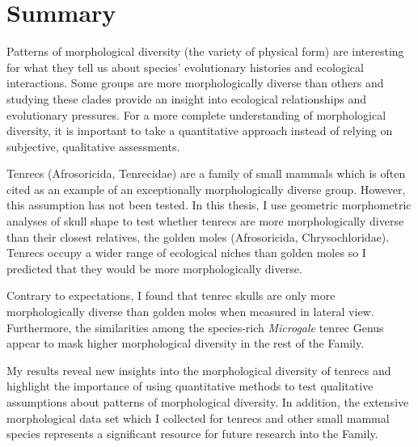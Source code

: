 \chapter*{Summary}

	Patterns of morphological diversity (the variety of physical form) are interesting for what they tell us about species' evolutionary histories and ecological interactions. Some groups are more morphologically diverse than others and studying these clades provide an insight into ecological relationships and evolutionary pressures. For a more complete understanding of morphological diversity, it is important to take a quantitative approach instead of relying on subjective, qualitative assessments. 
	
	Tenrecs (Afrosoricida, Tenrecidae) are a family of small mammals which is often cited as an example of an exceptionally morphologically diverse group. However, this assumption has not been tested. In this thesis, I use geometric morphometric analyses of skull shape to test whether tenrecs are more morphologically diverse than their closest relatives, the golden moles (Afrosoricida, Chrysochloridae). Tenrecs occupy a wider range of ecological niches than golden moles so I predicted that they would be more morphologically diverse. 
	
	Contrary to expectations, I found that tenrec skulls are only more morphologically diverse than golden moles when measured in lateral view. Furthermore, the similarities among the species-rich \textit{Microgale} tenrec Genus appear to mask higher morphological diversity in the rest of the Family. 
	
	My results reveal new insights into the morphological diversity of tenrecs and highlight the importance of using quantitative methods to test qualitative assumptions about patterns of morphological diversity. In addition, the extensive morphological data set which I collected for tenrecs and other small mammal species represents a significant resource for future research into the Family.
	
